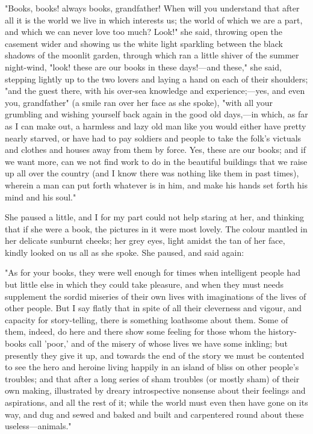 "Books, books! always books, grandfather! When will you understand that
after all it is the world we live in which interests us; the world of
which we are a part, and which we can never love too much? Look!" she
said, throwing open the casement wider and showing us the white light
sparkling between the black shadows of the moonlit garden, through which
ran a little shiver of the summer night-wind, "look! these are our books
in these days!---and these," she said, stepping lightly up to the two
lovers and laying a hand on each of their shoulders; "and the guest
there, with his over-sea knowledge and experience;---yes, and even you,
grandfather" (a smile ran over her face as she spoke), "with all your
grumbling and wishing yourself back again in the good old days,---in
which, as far as I can make out, a harmless and lazy old man like you
would either have pretty nearly starved, or have had to pay soldiers and
people to take the folk's victuals and clothes and houses away from them
by force. Yes, these are our books; and if we want more, can we not find
work to do in the beautiful buildings that we raise up all over the
country (and I know there was nothing like them in past times), wherein
a man can put forth whatever is in him, and make his hands set forth his
mind and his soul."

She paused a little, and I for my part could not help staring at her,
and thinking that if she were a book, the pictures in it were most
lovely. The colour mantled in her delicate sunburnt cheeks; her grey
eyes, light amidst the tan of her face, kindly looked on us all as she
spoke. She paused, and said again:

"As for your books, they were well enough for times when intelligent
people had but little else in which they could take pleasure, and when
they must needs supplement the sordid miseries of their own lives with
imaginations of the lives of other people. But I say flatly that in
spite of all their cleverness and vigour, and capacity for
story-telling, there is something loathsome about them. Some of them,
indeed, do here and there show some feeling for those whom the
history-books call 'poor,' and of the misery of whose lives we have some
inkling; but presently they give it up, and towards the end of the story
we must be contented to see the hero and heroine living happily in an
island of bliss on other people's troubles; and that after a long series
of sham troubles (or mostly sham) of their own making, illustrated by
dreary introspective nonsense about their feelings and aspirations, and
all the rest of it; while the world must even then have gone on its way,
and dug and sewed and baked and built and carpentered round about these
useless---animals."

